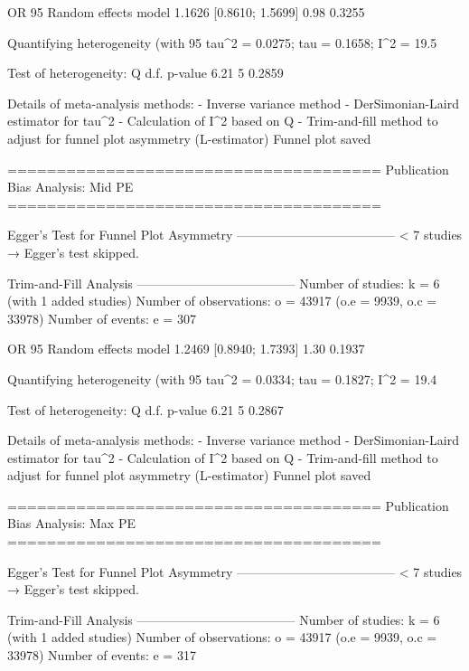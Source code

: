                          OR           95%
Random effects model 1.1626 [0.8610; 1.5699] 0.98  0.3255

Quantifying heterogeneity (with 95%
 tau^2 = 0.0275; tau = 0.1658; I^2 = 19.5%

Test of heterogeneity:
    Q d.f. p-value
 6.21    5  0.2859

Details of meta-analysis methods:
- Inverse variance method
- DerSimonian-Laird estimator for tau^2
- Calculation of I^2 based on Q
- Trim-and-fill method to adjust for funnel plot asymmetry (L-estimator)
  Funnel plot saved

======================================
Publication Bias Analysis: Mid PE 
======================================
                                                                                                                                                        
Egger's Test for Funnel Plot Asymmetry
--------------------------------------
  < 7 studies → Egger’s test skipped.

Trim-and-Fill Analysis
--------------------------------------
Number of studies: k = 6 (with 1 added studies)
Number of observations: o = 43917 (o.e = 9939, o.c = 33978)
Number of events: e = 307

                         OR           95%
Random effects model 1.2469 [0.8940; 1.7393] 1.30  0.1937

Quantifying heterogeneity (with 95%
 tau^2 = 0.0334; tau = 0.1827; I^2 = 19.4%

Test of heterogeneity:
    Q d.f. p-value
 6.21    5  0.2867

Details of meta-analysis methods:
- Inverse variance method
- DerSimonian-Laird estimator for tau^2
- Calculation of I^2 based on Q
- Trim-and-fill method to adjust for funnel plot asymmetry (L-estimator)
  Funnel plot saved

======================================
Publication Bias Analysis: Max PE 
======================================
                                                                                                                                                        
Egger's Test for Funnel Plot Asymmetry
--------------------------------------
  < 7 studies → Egger’s test skipped.

Trim-and-Fill Analysis
--------------------------------------
Number of studies: k = 6 (with 1 added studies)
Number of observations: o = 43917 (o.e = 9939, o.c = 33978)
Number of events: e = 317

